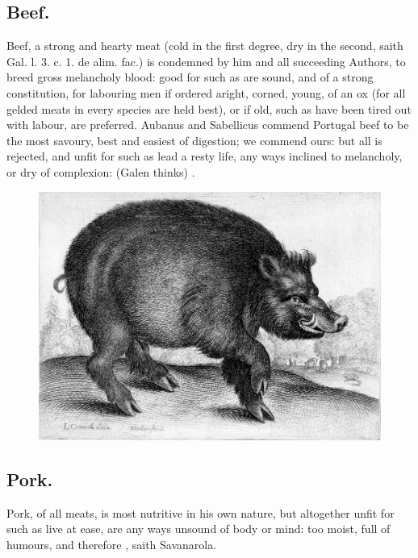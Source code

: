 {{\subsection{Beef.}
Beef, a strong and hearty meat (cold in the first degree, dry
in the second, saith \textlatin{Gal. l. 3. c. 1. de alim. fac.}) is condemned by
him and all succeeding Authors, to breed gross melancholy blood: good
for such as are sound, and of a strong constitution, for labouring men
if ordered aright, corned, young, of an ox (for all gelded meats in
every species are held best), or if old, such as have been tired
out with labour, are preferred. Aubanus and Sabellicus commend Portugal
beef to be the most savoury, best and easiest of digestion; we commend
ours: but all is rejected, and unfit for such as lead a resty life, any
ways inclined to melancholy, or dry of complexion:  (Galen thinks)
.
\begin{figure}[H]
  \begingroup
  \centering
  \includegraphics[keepaspectratio,width=\textwidth]{figures/wild-boar-small.jpg}
  \label{fig:wildboar}
\end{figure}
\subsection{Pork.}
Pork, of all meats, is most nutritive in his own nature,
 but altogether unfit for such as live at ease, are any ways
unsound of body or mind: too moist, full of humours, and therefore
, saith Savanarola.
}}
